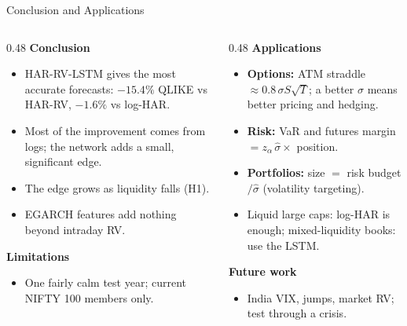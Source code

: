 \documentclass[aspectratio=169, 10pt]{beamer}
\begin{document}
\begin{frame}{Conclusion and Applications}
    \begin{columns}[T]
        \begin{column}{0.48\textwidth}
            \textbf{Conclusion}
            \begin{itemize}
                \item HAR-RV-LSTM gives the most accurate forecasts: $-15.4\%$ QLIKE vs HAR-RV, $-1.6\%$ vs log-HAR.
                \item Most of the improvement comes from logs; the network adds a small, significant edge.
                \item The edge grows as liquidity falls (H1).
                \item EGARCH features add nothing beyond intraday RV.
            \end{itemize}
            \vspace{0.2cm}
            \textbf{Limitations}
            \begin{itemize}
                \item One fairly calm test year; current NIFTY 100 members only.
            \end{itemize}
        \end{column}
        \begin{column}{0.48\textwidth}
            \textbf{Applications}
            \begin{itemize}
                \item \textbf{Options:} ATM straddle $\approx 0.8\,\sigma S\sqrt{T}$; a better $\sigma$ means better pricing and hedging.
                \item \textbf{Risk:} VaR and futures margin $= z_\alpha\,\hat\sigma \times$ position.
                \item \textbf{Portfolios:} size $=$ risk budget$/\hat\sigma$ (volatility targeting).
                \item Liquid large caps: log-HAR is enough; mixed-liquidity books: use the LSTM.
            \end{itemize}
            \vspace{0.2cm}
            \textbf{Future work}
            \begin{itemize}
                \item India VIX, jumps, market RV; test through a crisis.
            \end{itemize}
        \end{column}
    \end{columns}
\end{frame}
\end{document}

